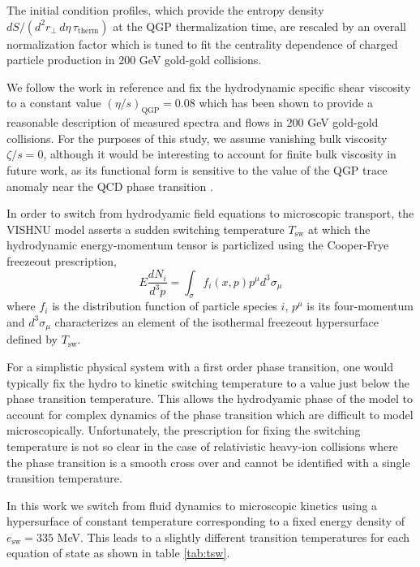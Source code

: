 \documentclass[aps,prc,reprint,amsmath,nofootinbib,superscriptaddress]{revtex4-1}
\begin{document}
The initial condition profiles, which provide the entropy density $dS/(d^2r_\perp\, d\eta\, \tau_\text{therm})$ at the QGP thermalization time, are rescaled
by an overall normalization factor which is tuned to fit the centrality dependence of charged particle production in $200$ GeV gold-gold collisions.

We follow the work in reference \cite{?} and fix the hydrodynamic specific shear viscosity to a constant value $(\eta/s)_\text{QGP}=0.08$ which has been shown to
provide a reasonable description of measured spectra and flows in $200$ GeV gold-gold collisions. For the purposes of this study, we assume vanishing bulk viscosity 
$\zeta/s=0$, although it would be interesting to account for finite bulk viscosity in future work, as its functional form is sensitive to the value of the QGP trace 
anomaly near the QCD phase transition \cite{?}.

In order to switch from hydrodyamic field equations to microscopic transport, the VISHNU model asserts a sudden switching temperature $T_\text{sw}$ at which the 
hydrodynamic energy-momentum tensor is particlized using the Cooper-Frye freezeout prescription,
\begin{equation}
 E\frac{dN_i}{d^3p} = \int_\sigma f_i(x,p) p^\mu d^3\sigma_\mu
 \label{cooper-frye}
\end{equation}
where $f_i$ is the distribution function of particle species $i$, $p^\mu$ is its four-momentum and $d^3\sigma_\mu$ characterizes an element of the isothermal 
freezeout hypersurface defined by $T_\text{sw}$.

For a simplistic physical system with a first order phase transition, one would typically fix the hydro to kinetic switching temperature to a value just below the phase 
transition temperature. This allows the hydrodyamic phase of the model to account for complex dynamics of the phase transition which are difficult to model 
microscopically. Unfortunately, the prescription for fixing the switching temperature is not so clear in the case of relativistic heavy-ion collisions where the 
phase transition is a smooth cross over and cannot be identified with a single transition temperature. 

In this work we switch from fluid dynamics to microscopic kinetics using a hypersurface of constant temperature corresponding to a fixed energy density of 
$e_\text{sw}= 335$ MeV. This leads to a slightly different transition temperatures for each equation of state as shown in table \ref{tab:tsw}.
\end{document}

